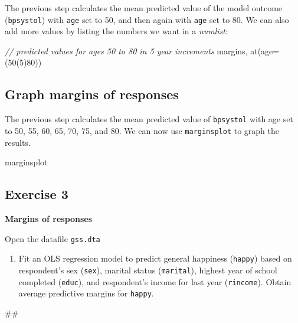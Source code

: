 \documentclass[
]{book}
\newenvironment{Shaded}{\begin{snugshade}}{\end{snugshade}}
\newcommand{\CommentTok}[1]{\textcolor[rgb]{0.56,0.35,0.01}{\textit{#1}}}
\newcommand{\FunctionTok}[1]{\textcolor[rgb]{0.00,0.00,0.00}{#1}}
\newcommand{\NormalTok}[1]{#1}
\providecommand{\tightlist}{%
  \setlength{\itemsep}{0pt}\setlength{\parskip}{0pt}}
\begin{document}
The previous step calculates the mean predicted value of the model outcome (\texttt{bpsystol}) with \texttt{age} set to 50, and then again with \texttt{age} set to 80. We can also add more values by listing the numbers we want in a \emph{numlist}:

\begin{Shaded}
\begin{Highlighting}[]
\CommentTok{// predicted values for ages 50 to 80 in 5 year increments}
\NormalTok{margins, }\FunctionTok{at}\NormalTok{(age=(50(5)80))}
\end{Highlighting}
\end{Shaded}

\hypertarget{graph-margins-of-responses}{%
\subsection{Graph margins of responses}\label{graph-margins-of-responses}}

The previous step calculates the mean predicted value of \texttt{bpsystol} with age set to 50, 55, 60, 65, 70, 75, and 80. We can now use \texttt{marginsplot} to graph the results.

\begin{Shaded}
\begin{Highlighting}[]
\NormalTok{marginsplot}
\end{Highlighting}
\end{Shaded}

\hypertarget{exercise-3-5}{%
\subsection{Exercise 3}\label{exercise-3-5}}

\textbf{Margins of responses}

Open the datafile \texttt{gss.dta}

\begin{enumerate}
\def\labelenumi{\arabic{enumi}.}
\tightlist
\item
  Fit an OLS regression model to predict general happiness (\texttt{happy}) based on respondent's sex (\texttt{sex}), marital status (\texttt{marital}), highest year of school completed (\texttt{educ}), and respondent's income for last year (\texttt{rincome}). Obtain average predictive margins for \texttt{happy}.
\end{enumerate}

\begin{Shaded}
\begin{Highlighting}[]
\NormalTok{\#\#}
\end{Highlighting}
\end{Shaded}
\end{document}
